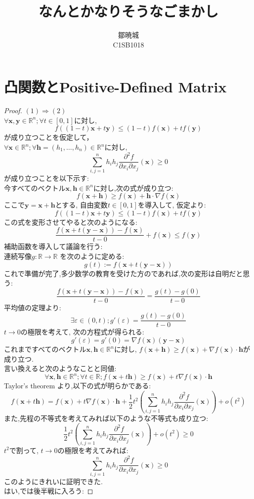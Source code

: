 \documentclass[dvipdfmx]{jsarticle}
\begin{document}
\title{なんとかなりそうなごまかし}
\author{鄒暁城\\ C1SB1018}
\maketitle
\newpage
\tableofcontents
{}
\newpage
\section{凸関数とPositive-Defined Matrix}
\begin{proof}
$(1) \Longrightarrow (2)$ \\
$\forall \bm{x}, \bm{y} \in \mathbb{R}^n ; \forall t \in [0,1]$に対し,
$$
f \left( (1-t)\bm{x} + t \bm{y} \right) \le (1-t)f(\bm{x}) + tf(\bm{y})
$$
が成り立つことを仮定して，\\
$\forall \bm{x} \in \mathbb{R}^n; \forall \bm{h} =(h_1, \ldots , h_n) \in \mathbb{R}^n$に対し, 
$$
\sum_{i,j=1}^{n}h_i h_j \frac{\partial^2 f}{\partial x_i \partial x_j}(\bm{x}) \ge 0
$$
が成り立つことを以下示す:\\
今すべてのベクトル$\bm{x},\bm{h} \in \mathbb{R}^n$に対し,次の式が成り立つ:
$$
f(\bm{x} + \bm{h}) \ge f(\bm{x}) + \bm{h} \cdot \nabla f(\bm{x})
$$
ここで$\bm{y} = \bm{x} + \bm{h}$とする, 自由変数$t \in [0,1]$を導入して, 仮定より:
$$f \left( (1-t)\bm{x} + t \bm{y} \right) \le (1-t)f(\bm{x}) + tf(\bm{y})$$
この式を変形させてやると次のようになる:
$$
	\frac{f(\bm{x} + t(\bm{y} - \bm{x}))-f(\bm{x})}{t-0} +f(\bm{x}) \le f(\bm{y})
$$
補助函数を導入して議論を行う:\\
連続写像$g: \mathbb{R} \to \mathbb{R}$ を次のように定める:
$$
g(t) := f(\bm{x} + t(\bm{y} - \bm{x}))
$$
これで準備が完了,多少数学の教育を受けた方のであれば,次の変形は自明だと思う:
$$
\frac{f(\bm{x} + t(\bm{y} - \bm{x}))-f(\bm{x})}{t-0} = \frac{g(t) - g(0)}{t-0}
$$
平均値の定理より:
$$
\exists \varepsilon \in (0,t); g'(\varepsilon ) =\frac{g(t) - g(0)}{t-0}
$$
$ t \to 0$の極限を考えて, 次の方程式が得られる:
$$
g'(\varepsilon) = g'(0) = \nabla f(\bm{x}) (\bm{y} - \bm{x})
$$
これまですべてのベクトル$\bm{x} ,\bm{h} \in \mathbb{R}^n$に対し, $f(\bm{x}+ \bm{h}) \ge f(\bm{x} ) + \nabla f(\bm{x})\cdot \bm{h}$が成り立つ.\\
言い換えると次のようなことと同値:
$$
\forall \bm{x} ,\bm{h} \in \mathbb{R}^n; \forall t \in \mathbb{R}; f(\bm{x}+t\bm{h} ) \ge f(\bm{x}) + t \nabla f(\bm{x}) \cdot \bm{h}
$$
Taylor's theorem より,以下の式が明らかである:
$$
f(\bm{x}+t\bm{h} ) =  f(\bm{x}) + t \nabla f(\bm{x}) \cdot \bm{h} + \frac{1}{2} t^2 \left( \sum_{i,j =1}^n h_i h_j \frac{\partial^2 f}{\partial x_i \partial x_j}(\bm{x}) \right) + o(t^2)
$$
また,先程の不等式を考えてみれば以下のような不等式も成り立つ:
$$
\frac{1}{2} t^2 \left( \sum_{i,j =1}^n h_i h_j \frac{\partial^2 f}{\partial x_i \partial x_j}(\bm{x}) \right) + o(t^2) \ge 0
$$
$t^2$で割って, $t \to 0$の極限を考えてみれば:
$$
	\sum_{i,j =1}^n h_i h_j \frac{\partial^2 f}{\partial x_i \partial x_j}(\bm{x})\ge 0
$$
このようにきれいに証明できた.\\

\noindent はい,では後半戦に入ろう:
\end{proof}
\end{document}
